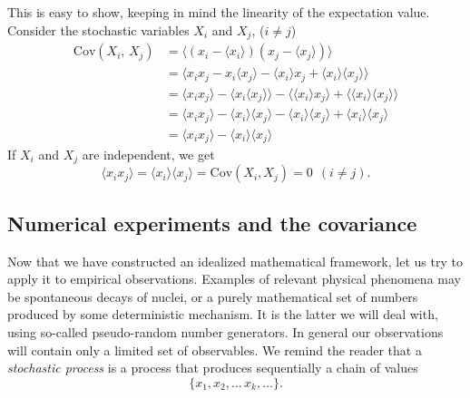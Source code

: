 \documentclass[%
oneside,                 %
final,                   %
10pt]{article}
\newenvironment{block_mdfboxadmon}[1][]{
\begin{block_mdfboxmdframed}[frametitle=#1]
}
{
\end{block_mdfboxmdframed}
}
\begin{document}
\begin{block_mdfboxadmon}[]

This is easy to show, keeping in mind the linearity of
the expectation value. Consider the stochastic variables $X_i$ and
$X_j$, ($i\neq j$)
\begin{align*}
\mathrm{Cov}(X_i,\,X_j) &= \langle (x_i-\langle x_i\rangle)(x_j-\langle x_j\rangle)\rangle\\
&=\langle x_i x_j - x_i\langle x_j\rangle - \langle x_i\rangle x_j + \langle x_i\rangle\langle x_j\rangle\rangle\\
&=\langle x_i x_j\rangle - \langle x_i\langle x_j\rangle\rangle - \langle \langle x_i\rangle x_j \rangle +
\langle \langle x_i\rangle\langle x_j\rangle\rangle\\
&=\langle x_i x_j\rangle - \langle x_i\rangle\langle x_j\rangle - \langle x_i\rangle\langle x_j\rangle +
\langle x_i\rangle\langle x_j\rangle\\
&=\langle x_i x_j\rangle - \langle x_i\rangle\langle x_j\rangle
\end{align*}
If $X_i$ and $X_j$ are independent, we get 
\[
\langle x_i x_j\rangle =
\langle x_i\rangle\langle x_j\rangle=\mathrm{Cov}(X_i, X_j) = 0\ \ (i\neq j).
\]
\end{block_mdfboxadmon} %




\subsection{Numerical experiments and the covariance}

\begin{block_mdfboxadmon}[]

Now that we have constructed an idealized mathematical framework, let
us try to apply it to empirical observations. Examples of relevant
physical phenomena may be spontaneous decays of nuclei, or a purely
mathematical set of numbers produced by some deterministic
mechanism. It is the latter we will deal with, using so-called pseudo-random
number generators.  In general our observations will contain only a limited set of
observables. We remind the reader that
a \emph{stochastic process} is a process that produces sequentially a
chain of values
\begin{equation*}
\{x_1, x_2,\dots\,x_k,\dots\}.
\end{equation*}
\end{block_mdfboxadmon} %
\end{document}
